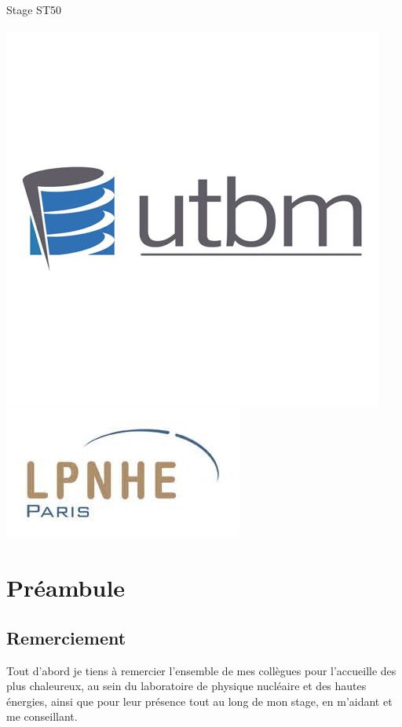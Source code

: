 \documentclass[french,a4paper,12pt]{report}
\begin{document}
\begin{titlepage}
    \vspace{1cm}
      {\large{	\@date\\
    \vspace{1cm}
       Stage ST50}}\\
    \vspace{1cm}
        {\large \@author} \\
    \vfill
        \includegraphics[height=0.13\textheight]{UTBM_LOGO.png}
        \hfill
        \includegraphics[height=0.09\textheight]{LPNHE_LOGO.png}
  \end{titlepage}
\makeatother

\tableofcontents

\part{Préambule}

  \chapter{Remerciement}
  Tout d'abord je tiens à remercier l'ensemble de mes collègues pour l'accueille des plus chaleureux, au sein du laboratoire de physique nucléaire et des hautes énergies, ainsi que pour leur présence tout au long de mon stage, en m'aidant et me conseillant.\newline
  
\end{document}
